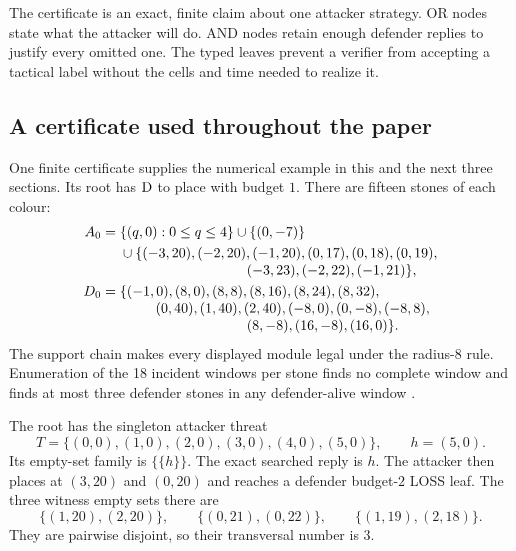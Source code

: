 \begin{plainterms}
The certificate is an exact, finite claim about one attacker strategy.  OR
nodes state what the attacker will do.  AND nodes retain enough defender
replies to justify every omitted one.  The typed leaves prevent a verifier
from accepting a tactical label without the cells and time needed to realize
it.
\end{plainterms}

\subsection{A certificate used throughout the paper}
\label{subsec:running-example}

One finite certificate supplies the numerical example in this and the next
three sections.  Its root has $\mathrm{D}$ to place with budget $1$.  There are
fifteen stones of each colour:
\begin{align*}
A_0={}&\{(q,0):0\le q\le4\}\cup\{(0,-7)\}\\
 &\cup\{(-3,20),(-2,20),(-1,20),
          (0,17),(0,18),(0,19),\\[-1mm]
 &\hspace{32mm}(-3,23),(-2,22),(-1,21)\},\\
D_0={}&\{(-1,0),(8,0),(8,8),(8,16),(8,24),(8,32),\\[-1mm]
 &\hspace{9mm}(0,40),(1,40),(2,40),
          (-8,0),(0,-8),(-8,8),\\[-1mm]
 &\hspace{32mm}(8,-8),(16,-8),(16,0)\}.
\end{align*}
The support chain makes every displayed module legal under the radius-$8$
rule.  Enumeration of the 18 incident windows per stone finds no complete
window and finds at most three defender stones in any defender-alive window
\cite{hexobot-companions}.

The root has the singleton attacker threat
\[
  T=\{(0,0),(1,0),(2,0),(3,0),(4,0),(5,0)\},
  \qquad h=(5,0).
\]
Its empty-set family is $\{\{h\}\}$.  The exact searched reply is $h$.
The attacker then places at $(3,20)$ and $(0,20)$ and reaches a defender
budget-$2$ LOSS leaf.  The three witness empty sets there are
\[
 \{(1,20),(2,20)\},\qquad
 \{(0,21),(0,22)\},\qquad
 \{(1,19),(2,18)\}.
\]
They are pairwise disjoint, so their transversal number is $3$.

